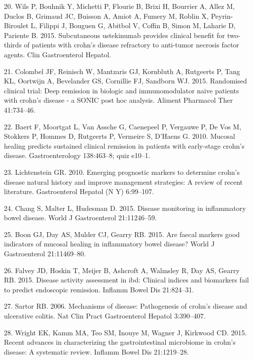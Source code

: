 \documentclass[12pt,]{article}
\begin{document}
\hypertarget{ref-wils_ust_2015}{}
20. Wils P, Bouhnik Y, Michetti P, Flourie B, Brixi H, Bourrier A, Allez
M, Duclos B, Grimaud JC, Buisson A, Amiot A, Fumery M, Roblin X,
Peyrin-Biroulet L, Filippi J, Bouguen G, Abitbol V, Coffin B, Simon M,
Laharie D, Pariente B. 2015. Subcutaneous ustekinumab provides clinical
benefit for two-thirds of patients with crohn's disease refractory to
anti-tumor necrosis factor agents. Clin Gastroenterol Hepatol.

\hypertarget{ref-colombel_deepremission_2015}{}
21. Colombel JF, Reinisch W, Mantzaris GJ, Kornbluth A, Rutgeerts P,
Tang KL, Oortwijn A, Bevelander GS, Cornillie FJ, Sandborn WJ. 2015.
Randomised clinical trial: Deep remission in biologic and
immunomodulator naive patients with crohn's disease - a SONIC post hoc
analysis. Aliment Pharmacol Ther 41:734--46.

\hypertarget{ref-baert_mucosalhealing_2010}{}
22. Baert F, Moortgat L, Van Assche G, Caenepeel P, Vergauwe P, De Vos
M, Stokkers P, Hommes D, Rutgeerts P, Vermeire S, D'Haens G. 2010.
Mucosal healing predicts sustained clinical remission in patients with
early-stage crohn's disease. Gastroenterology 138:463--8; quiz e10--1.

\hypertarget{ref-Lichtenstein_biomarkers_2010}{}
23. Lichtenstein GR. 2010. Emerging prognostic markers to determine
crohn's disease natural history and improve management strategies: A
review of recent literature. Gastroenterol Hepatol (N Y) 6:99--107.

\hypertarget{ref-Chang_biomarkers_2015}{}
24. Chang S, Malter L, Hudesman D. 2015. Disease monitoring in
inflammatory bowel disease. World J Gastroenterol 21:11246--59.

\hypertarget{ref-Boon_biomarkers_2015}{}
25. Boon GJ, Day AS, Mulder CJ, Gearry RB. 2015. Are faecal markers good
indicators of mucosal healing in inflammatory bowel disease? World J
Gastroenterol 21:11469--80.

\hypertarget{ref-Falvey_biomarkers_2015}{}
26. Falvey JD, Hoskin T, Meijer B, Ashcroft A, Walmsley R, Day AS,
Gearry RB. 2015. Disease activity assessment in ibd: Clinical indices
and biomarkers fail to predict endoscopic remission. Inflamm Bowel Dis
21:824--31.

\hypertarget{ref-sartor_IBDpath_2006}{}
27. Sartor RB. 2006. Mechanisms of disease: Pathogenesis of crohn's
disease and ulcerative colitis. Nat Clin Pract Gastroenterol Hepatol
3:390--407.

\hypertarget{ref-wright_CDmicrobiome_2015}{}
28. Wright EK, Kamm MA, Teo SM, Inouye M, Wagner J, Kirkwood CD. 2015.
Recent advances in characterizing the gastrointestinal microbiome in
crohn's disease: A systematic review. Inflamm Bowel Dis 21:1219--28.
\end{document}
